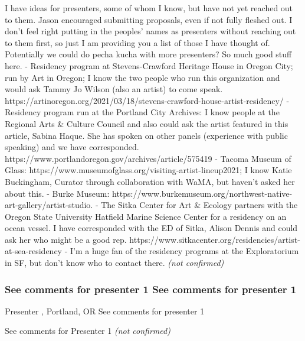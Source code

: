 \documentclass{report}
\begin{document}
                I have ideas for presenters, some of whom I know, but have not yet reached out to them. Jason encouraged submitting proposals, even if not fully fleshed out. I don't feel right putting in the peoples' names as presenters without reaching out to them first, so just I am providing you a list of those I have thought of. Potentially we could do pecha kucha with more presenters? So much good stuff here.
- Residency program at Stevens-Crawford Heritage House in Oregon City; run by Art in Oregon; I know the two people who run this organization and would ask Tammy Jo Wilson (also an artist) to come speak. https://artinoregon.org/2021/03/18/stevens-crawford-house-artist-residency/ 
- Residency program run at the Portland City Archives: I know people at the Regional Arts \& Culture Council and also could ask the artist featured in this article, Sabina Haque. She has spoken on other panels (experience with public speaking) and we have corresponded. https://www.portlandoregon.gov/archives/article/575419 
- Tacoma Museum of Glass: https://www.museumofglass.org/visiting-artist-lineup2021; I know Katie Buckingham, Curator through collaboration with WaMA, but haven't asked her about this.
- Burke Museum: https://www.burkemuseum.org/northwest-native-art-gallery/artist-studio.
- The Sitka Center for Art \& Ecology partners with the Oregon State University Hatfield Marine Science Center for a residency on an ocean vessel. I have corresponded with the ED of Sitka, Alison Dennis and could ask her who might be a good rep. https://www.sitkacenter.org/residencies/artist-at-sea-residency 
- I'm a huge fan of the residency programs at the Exploratorium in SF, but don't know who to contact there.
                \emph{ (not confirmed) }
              

              
                \subsubsection*{ See comments for presenter 1 See comments for presenter 1 }
                Presenter\newline
                \newline
                , Portland, OR
                \newline
                See comments for presenter 1\newline
                
                

                See comments for Presenter 1
                \emph{ (not confirmed) }
              
\end{document}
